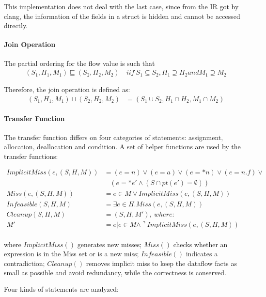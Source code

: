 This implementation does not deal with the last case, since from the 
\llvm IR got by clang, the information of the fields in a struct is hidden and 
cannot be accessed directly.

\paragraph{Join Operation}

The partial ordering for the flow value is such that 
\begin{align*}
  (S_1,H_1,M_1)\sqsubseteq (S_2,H_2,M_2) \ &iif \ 
  S_1\subseteq S_2, H_1\supseteq H_2 and M_1\supseteq M_2
\end{align*}

Therefore, the join operation is defined as:
\begin{align*}
  (S_1,H_1,M_1)\sqcup (S_2,H_2,M_2) &= (S_1\cup S_2,H_1\cap H_2,M_1\cap M_2)
\end{align*}


\paragraph{Transfer Function}

The transfer function differs on four categories of statements: assignment, 
allocation, deallocation and condition. A set of helper functions are used 
by the transfer functions:

\begin{align*}
  ImplicitMiss(e,(S,H,M)) &= (e=n) \vee (e=a) \vee (e=*n) \vee (e=n.f) \vee \\
                          &\ \ \ \ (e=*e' \wedge (S\cap pt(e')=\emptyset)) \\
  Miss(e,(S,H,M)) &= e\in M \vee ImplicitMiss(e,(S,H,M)) \\
Infeasible(S,H,M) &= \exists e \in H. Miss(e,(S,H,M)) \\
   Cleanup(S,H,M) &= (S,H,M'), \ where: \\
  M' &= {e|e\in M \wedge \urcorner ImplicitMiss(e,(S,H,M))} \\
\end{align*}

where $ImplicitMiss()$ generates new misses;
$Miss()$ checks whether an expression is in the Miss set or is a new miss; 
$Infeasible()$ indicates a contradiction;
$Cleanup()$ removes implicit miss to keep the dataflow facts as small as possible and avoid redundancy, while the correctness is conserved.

Four kinds of statements are analyzed:

